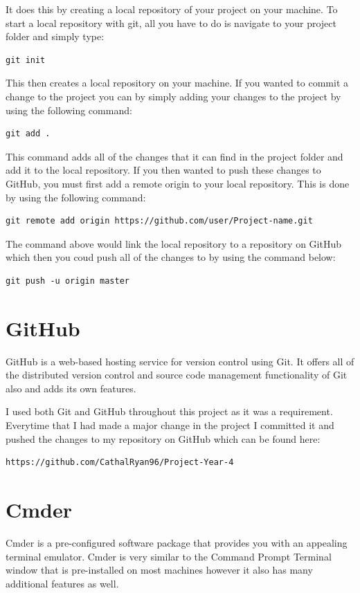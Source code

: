 It does this by creating a local repository of your project on your machine. To start a local repository with git, all you have to do is navigate to your project folder and simply type:

\begin{lstlisting}
git init
\end{lstlisting}

This then creates a local repository on your machine. If you wanted to commit a change to the project you can by simply adding your changes to the project by using the following command:

\begin{lstlisting}
git add .
\end{lstlisting}

This command adds all of the changes that it can find in the project folder and add it to the local repository. If you then wanted to push these changes to GitHub, you must first add a remote origin to your local repository. This is done by using the following command:

\begin{lstlisting}
git remote add origin https://github.com/user/Project-name.git
\end{lstlisting}

The command above would link the local repository to a repository on GitHub which then you coud push all of the changes to by using the command below:

\begin{lstlisting}
git push -u origin master
\end{lstlisting}


\section{GitHub}
GitHub is  a web-based hosting service for version control using Git. It offers all of the distributed version control and source code management functionality of Git also and adds its own features\cite{GitHub}.

I used both Git and GitHub throughout this project as it was a requirement. Everytime that I had made a major change in the project I committed it and pushed the changes to my repository on GitHub which can be found here:

\begin{lstlisting}
https://github.com/CathalRyan96/Project-Year-4
\end{lstlisting}

\section{Cmder}
Cmder is a pre-configured software package that provides you with an appealing terminal emulator\cite{Cmder}. Cmder is very similar to the Command Prompt Terminal window that is pre-installed on most machines however it also has many additional features as well.

